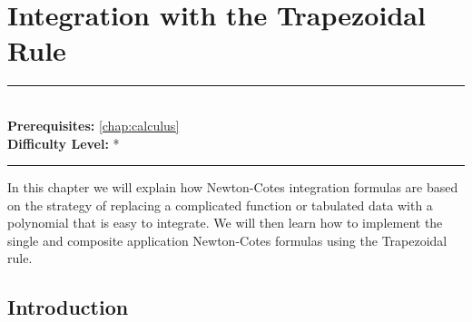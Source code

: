 \documentclass[book.tex]{subfiles}
\begin{document}
\chapter{Integration with the Trapezoidal Rule}
\label{chap:trapezoidal}
\noindent\rule{11cm}{0.4pt} \\
\textbf{Prerequisites:} \autoref{chap:calculus} \\
\textbf{Difficulty Level:} * \\
\noindent\rule{11cm}{0.4pt}
\vspace{5mm}

In this chapter we will explain how Newton-Cotes integration formulas are based on the strategy of replacing a complicated function or tabulated data with a polynomial that is easy to integrate. We will then learn how to implement the single and composite application Newton-Cotes formulas using the Trapezoidal rule. 

\section{Introduction}
\end{document}
